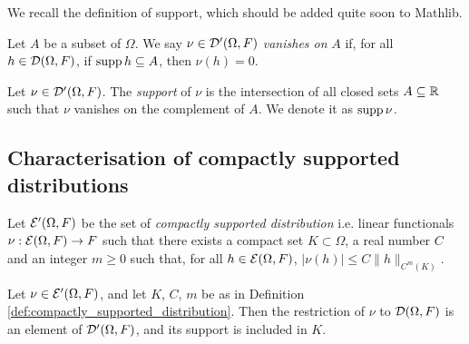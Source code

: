 We recall the definition of support, which should be added quite soon to Mathlib.

\begin{definition}
  \label{def:distribution_vanishes}
  Let $A$ be a subset of $\Omega$. We say $\nu \in \distrib[\Omega, F]$ \emph{vanishes on} $A$
  if, for all $h \in \testfunc[\Omega, F]$, if $\supp h \subseteq A$, then $\nu(h)=0$.
\end{definition}

\begin{definition}
  \label{def:support_distribution}
  Let $\nu \in \distrib[\Omega, F]$.
  The \emph{support} of $\nu$ is the intersection of all closed sets $A \subseteq \R$
  such that $\nu$ vanishes on the complement of $A$. We denote it as $\supp \nu$.
\end{definition}

\subsection{Characterisation of compactly supported distributions}

\begin{definition}
  \label{def:compactly_supported_distribution}
  Let $\csdistrib[\Omega,F]$ be the set of \emph{compactly supported distribution}
  i.e. linear functionals $\nu : \smooth[\Omega,F] \rightarrow F$
  such that there exists a compact set $K \subset \Omega$, a real number $C$
  and an integer $m\geq 0$ such that,
  for all $h \in \smooth[\Omega,F]$,
  $|\nu(h)| \leq C \|h\|_{C^m(K)}$.
\end{definition}

\begin{lemma}
  \label{lem:E_implies_CS}
  Let $\nu \in \csdistrib[\Omega,F]$, and let $K$, $C$, $m$ be as in Definition
  \ref{def:compactly_supported_distribution}.
  Then the restriction of $\nu$ to $\testfunc[\Omega,F]$ is an element of
  $\distrib[\Omega,F]$, and its support is included in $K$.
\end{lemma}

